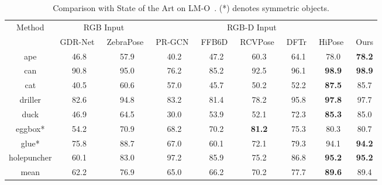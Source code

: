 \begin{sidewaystable}
    \centering
    \caption{Comparison with State of the Art on LM-O~\cite{brachmann2016lmo}. (*) denotes symmetric objects.}
    \begin{tabular}{c|c|c|c|c|c|c|c|c}
    \toprule 
    \multirow{2}{*}{Method} & \multicolumn{2}{c|}{RGB Input} & \multicolumn{5}{c}{RGB-D Input} \\ 
         \cline{2-9}
      & GDR-Net~\cite{wang2021gdr} 
& ZebraPose~\cite{su2022zebrapose}&  PR-GCN~\cite{Zhou2021PRGCNAD} 
& FFB6D~\cite{he2021ffb6d} 
& RCVPose~\cite{wu2022vote} 
& DFTr~\cite{zhou2023deep} & HiPose~\cite{2024hipose} & Ours\\
    \midrule
     ape & 46.8 
& 57.9& 40.2 
& 47.2 
&  60.3 
& 64.1 &  78.0 & \textbf{78.2}\\
     can & 90.8 
& 95.0& 76.2 
& 85.2 
&  92.5 
& 96.1 &  \textbf{98.9} & \textbf{98.9}  \\
     cat & 40.5 
& 60.6& 57.0 
& 45.7 
&  50.2 
& 52.2 &  \textbf{87.5} & 85.7\\
     driller & 82.6 
& 94.8& 83.2 
& 81.4 
&  78.2 
& 95.8 &  \textbf{97.8} & 97.7\\
     duck & 46.9 
& 64.5& 30.0 
& 53.9 
&  52.1 
& 72.3 &  \textbf{85.3} & 85.0\\
     eggbox* & 54.2 
& 70.9& 68.2 
& 70.2 
&  \textbf{81.2} 
& 75.3 &  80.3 & 80.7\\
     glue* & 75.8 
& 88.7& 67.0 
& 60.1 
&  72.1 
& 79.3 & 94.1 & \textbf{94.2}\\
     holepuncher & 60.1 
& 83.0& 97.2 
& 85.9 
& 75.2 
& 86.8 &  \textbf{95.2} & \textbf{95.2} \\
     \midrule
     mean & 62.2 & 76.9&  65.0 &  66.2 &  70.2 & 77.7 & \textbf{89.6} & 89.4\\
    \bottomrule
  \end{tabular}
  \label{tab:lmo_adds}
\end{sidewaystable}

